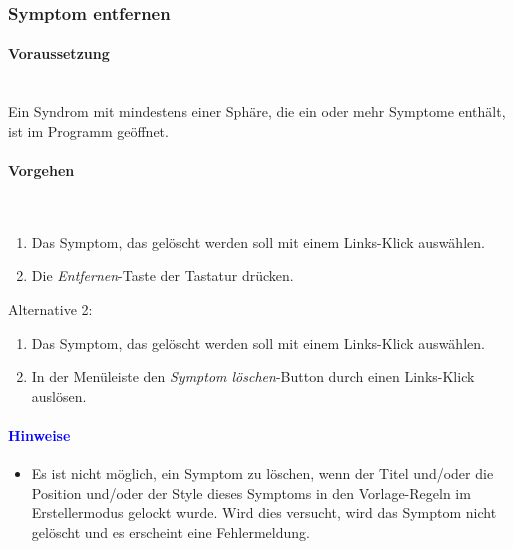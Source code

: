 \documentclass[enabledeprecatedfontcommands,fontsize=11pt,paper=a4,twoside]{scrartcl}
\newcommand*{\hint}{\paragraph{\textcolor{blue}{Hinweise}}}
\newcommand*{\condition}{\paragraph{Voraussetzung}$\;$ \vspace{0.2cm}\\}
\newcommand*{\actions}{\paragraph{Vorgehen} $\;$\vspace{0.2cm}\\}
\begin{document}
		\subsubsection{Symptom entfernen}
				\condition 	
		Ein Syndrom mit mindestens einer Sphäre, die ein oder mehr Symptome enthält, ist im Programm geöffnet. 
		\actions
		\begin{enumerate}
			\item Das Symptom, das gelöscht werden soll mit einem Links-Klick auswählen. 
			\item Die \textit{Entfernen}-Taste der Tastatur drücken.
		\end{enumerate}
		Alternative 2:
		\begin{enumerate}
			\item Das Symptom, das gelöscht werden soll mit einem Links-Klick auswählen. 
			\item In der Menüleiste den \textit{Symptom löschen}-Button durch einen Links-Klick auslösen.
		\end{enumerate}
		\hint
		\begin{itemize}
			\item Es ist nicht möglich, ein Symptom zu löschen, wenn der Titel und/oder die Position und/oder der Style dieses Symptoms in den Vorlage-Regeln im Erstellermodus gelockt wurde. Wird dies versucht, wird das Symptom nicht gelöscht und es erscheint eine Fehlermeldung.
		\end{itemize}
\end{document}
